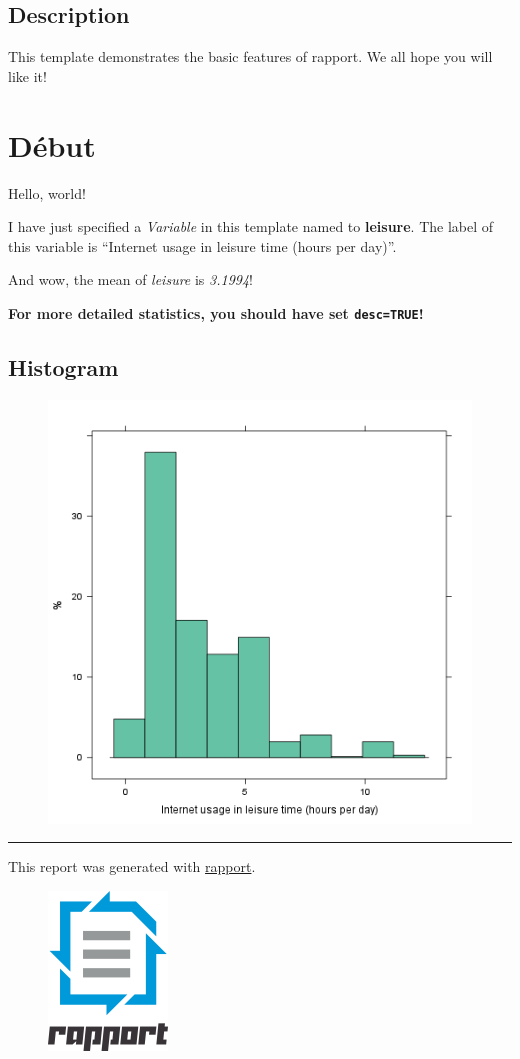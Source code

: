 \documentclass{article}
\makeatletter
\def\maxwidth{\ifdim\Gin@nat@width>\linewidth\linewidth
\else\Gin@nat@width\fi}
\let\Oldincludegraphics\includegraphics
\renewcommand{\includegraphics}[1]{\Oldincludegraphics[width=\maxwidth]{#1}}
\makeatother
\begin{document}
\subsection{Description}

This template demonstrates the basic features of rapport. We all hope
you will like it!

\section{Début}

Hello, world!

I have just specified a \emph{Variable} in this template named to
\textbf{leisure}. The label of this variable is ``Internet usage in
leisure time (hours per day)''.

And wow, the mean of \emph{leisure} is \emph{3.1994}!

\textbf{For more detailed statistics, you should have set
\texttt{desc=TRUE}!}

\subsection{Histogram}

\begin{figure}[htbp]
\centering
\includegraphics{f72d3b7413bcb88fce740c2ab229411a.png}
\caption{}
\end{figure}

\begin{center}\rule{3in}{0.4pt}\end{center}

This report was generated with
\href{http://rapport-package.info/}{rapport}.

\begin{figure}[htbp]
\centering
\includegraphics{images/rapport.png}
\caption{}
\end{figure}
\end{document}
